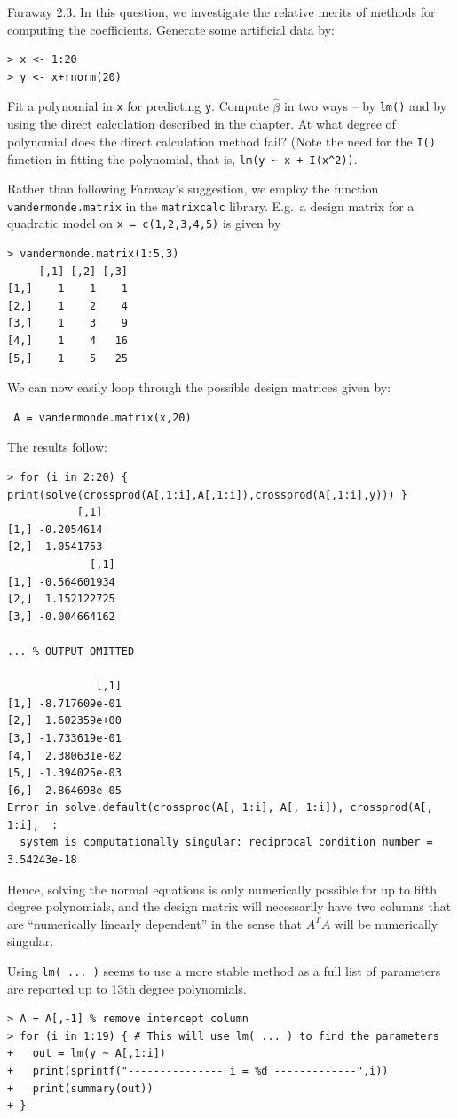 \documentclass{homework}
\begin{document}
\begin{longproblem}
  Faraway 2.3. In this question, we investigate the relative merits of methods for computing the coefficients.  Generate some artificial data by:
\begin{verbatim}
> x <- 1:20
> y <- x+rnorm(20)
\end{verbatim} 
Fit a polynomial in \texttt{x} for predicting \texttt y.  Compute $\hat \beta$ in two ways -- by \texttt{lm()} and by using the direct calculation described in the chapter.  At what degree of polynomial does the direct calculation method fail?  (Note the need for the \texttt{I()} function in fitting the polynomial, that is, \verb|lm(y ~ x + I(x^2))|.
\end{longproblem}
\begin{solution}
  Rather than following Faraway's suggestion, we employ the function \texttt{vandermonde.matrix} in the \texttt{matrixcalc} library.  E.g.~a design matrix for a quadratic model on \texttt{x = c(1,2,3,4,5)} is given by
\begin{verbatim}
> vandermonde.matrix(1:5,3)
     [,1] [,2] [,3]
[1,]    1    1    1
[2,]    1    2    4
[3,]    1    3    9
[4,]    1    4   16
[5,]    1    5   25
\end{verbatim}
We can now easily loop through the possible design matrices given by: 
\begin{verbatim} A = vandermonde.matrix(x,20) \end{verbatim} The results follow:
\begin{verbatim}
> for (i in 2:20) { print(solve(crossprod(A[,1:i],A[,1:i]),crossprod(A[,1:i],y))) }
           [,1]
[1,] -0.2054614
[2,]  1.0541753
             [,1]
[1,] -0.564601934
[2,]  1.152122725
[3,] -0.004664162

... % OUTPUT OMITTED

              [,1]
[1,] -8.717609e-01
[2,]  1.602359e+00
[3,] -1.733619e-01
[4,]  2.380631e-02
[5,] -1.394025e-03
[6,]  2.864698e-05
Error in solve.default(crossprod(A[, 1:i], A[, 1:i]), crossprod(A[, 1:i],  : 
  system is computationally singular: reciprocal condition number = 3.54243e-18

\end{verbatim}
Hence, solving the normal equations is only numerically possible for up to fifth degree polynomials, and the design matrix will necessarily have two columns that are ``numerically linearly dependent'' in the sense that $A^TA$ will be numerically singular.

Using \texttt{lm( ... )} seems to use a more stable method as a full list of parameters are reported up to 13th degree polynomials.
\begin{verbatim}
> A = A[,-1] % remove intercept column
> for (i in 1:19) { # This will use lm( ... ) to find the parameters
+   out = lm(y ~ A[,1:i])
+   print(sprintf("--------------- i = %d -------------",i))
+   print(summary(out))
+ } 


\end{verbatim}
\end{solution}
\end{document}
